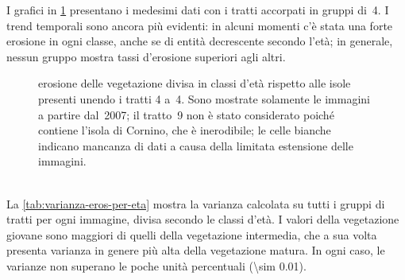 I grafici in \cref{graph:erosione-classi-eta-4tr-matrix} presentano i medesimi dati con i tratti accorpati in gruppi di~4.
I trend temporali sono ancora più evidenti: in alcuni momenti c'è stata una forte erosione in ogni classe, anche se di entità decrescente secondo l'età; in generale, nessun gruppo mostra tassi d'erosione superiori agli altri.
%
\begin{figure}
	\centering
	
	\vspace*{-1cm}
	\caption[erosione delle vegetazione divisa in classi d'età rispetto alle isole presenti unendo i tratti 4 a~4]{erosione delle vegetazione divisa in classi d'età rispetto alle isole presenti unendo i tratti 4 a~4.
	Sono mostrate solamente le immagini a partire dal~2007; il tratto~9 non è stato considerato poiché contiene l'isola di Cornino, che è inerodibile; le celle bianche indicano mancanza di dati a causa della limitata estensione delle immagini.}
	\label{graph:erosione-classi-eta-4tr-matrix}
\end{figure}
%
\\
La \cref{tab:varianza-eros-per-eta} mostra la varianza calcolata su tutti i gruppi di tratti per ogni immagine, divisa secondo le classi d'età.
I valori della vegetazione giovane sono maggiori di quelli della vegetazione intermedia, che a sua volta presenta varianza in genere più alta della vegetazione matura.
In ogni caso, le varianze non superano le poche unità percentuali (\num{\sim 0.01}).
%
